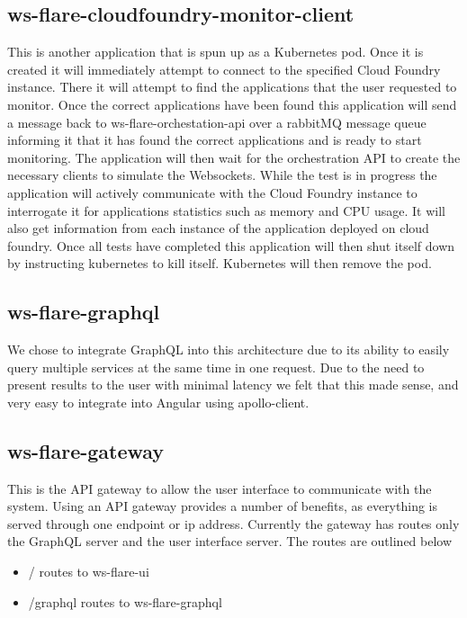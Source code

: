 \subsection{ws-flare-cloudfoundry-monitor-client}

This is another application that is spun up as a Kubernetes pod. Once it is created it will immediately attempt to connect to the specified Cloud Foundry instance. There it will attempt to find the applications that the user requested to monitor. Once the correct applications have been found this application will send a message back to ws-flare-orchestation-api over a rabbitMQ message queue informing it that it has found the correct applications and is ready to start monitoring. The application will then wait for the orchestration API to create the necessary clients to simulate the Websockets. While the test is in progress the application will actively communicate with the Cloud Foundry instance to interrogate it for applications statistics such as memory and CPU usage. It will also get information from each instance of the application deployed on cloud foundry. Once all tests have completed this application will then shut itself down by instructing kubernetes to kill itself. Kubernetes will then remove the pod.

\subsection{ws-flare-graphql}

We chose to integrate GraphQL into this architecture due to its ability to easily query multiple services at the same time in one request. Due to the need to present results to the user with minimal latency we felt that this made sense, and very easy to integrate into Angular using apollo-client.

\subsection{ws-flare-gateway}

This is the API gateway to allow the user interface to communicate with the system. Using an API gateway provides a number of benefits, as everything is served through one endpoint or ip address. Currently the gateway has routes only the GraphQL server and the user interface server. The routes are outlined below

\begin{itemize}
  \item / routes to ws-flare-ui
  \item /graphql routes to ws-flare-graphql
\end{itemize}

